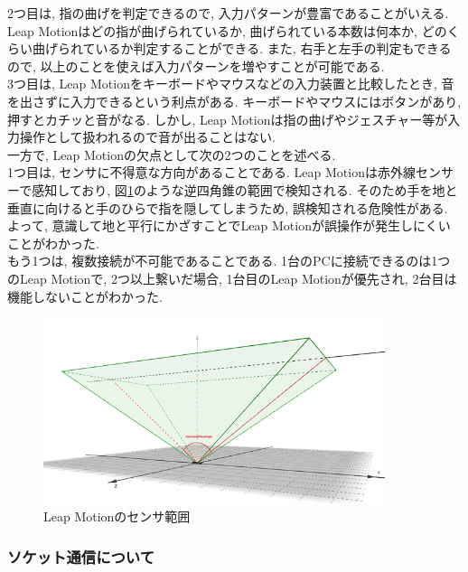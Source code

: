 \documentclass{funthesis}
\begin{document}
 
  2つ目は, 指の曲げを判定できるので, 入力パターンが豊富であることがいえる. Leap Motionはどの指が曲げられているか, 曲げられている本数は何本か, どのくらい曲げられているか判定することができる. また, 右手と左手の判定もできるので, 以上のことを使えば入力パターンを増やすことが可能である. \\
  3つ目は, Leap Motionをキーボードやマウスなどの入力装置と比較したとき, 音を出さずに入力できるという利点がある. キーボードやマウスにはボタンがあり, 押すとカチッと音がなる. しかし, Leap Motionは指の曲げやジェスチャー等が入力操作として扱われるので音が出ることはない. \\
  一方で, Leap Motionの欠点として次の2つのことを述べる.\\
  1つ目は, センサに不得意な方向があることである. Leap Motionは赤外線センサーで感知しており,  図\ref{leap}のような逆四角錐の範囲で検知される. そのため手を地と垂直に向けると手のひらで指を隠してしまうため, 誤検知される危険性がある. よって, 意識して地と平行にかざすことでLeap Motionが誤操作が発生しにくいことがわかった.\\
  もう1つは, 複数接続が不可能であることである. 1台のPCに接続できるのは1つのLeap Motionで, 2つ以上繋いだ場合, 1台目のLeap Motionが優先され, 2台目は機能しないことがわかった.\\
 
 \begin{figure}[H]
 \begin{center}
  \includegraphics[width=100mm]{./img/LeapAngle.png}
 \end{center}
 \caption{Leap Motionのセンサ範囲}
 \label{leap}
\end{figure}



\subsubsection{ソケット通信について}
\end{document}
